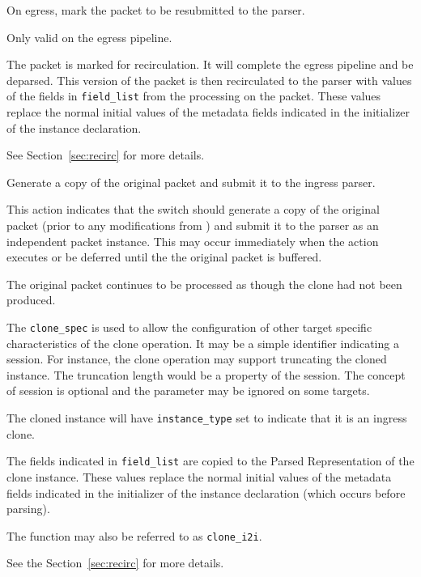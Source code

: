 \documentclass[12pt]{article}
\begin{document}

{ %
On egress, mark the packet to be resubmitted to the parser.
}
{ %
}
{ %
Only valid on the egress pipeline.

The packet is marked for  {\color{red}recirculation}. It will complete the egress pipeline 
and be deparsed.  This version of the packet is then {\color{red}recirculated} to the parser 
with values of the fields in \texttt{field_list} from the processing on the packet. 
These values replace the normal initial values of the metadata fields indicated 
in the initializer of the instance declaration.

See Section~\ref{sec:recirc} for more details.

}


{ %
Generate a copy of the original packet and submit it to the ingress parser.
}
{ %
}
{ %
This action indicates that the switch should generate a copy of the original 
packet (prior to any modifications from \matchaction) and submit it to the 
parser as an independent packet instance.  This may occur immediately when 
the action executes or be deferred until the the original packet is buffered. 
 

The original packet continues to be processed as though the clone had not 
been produced.

The \texttt{clone_spec} is used to allow the configuration of other target specific 
characteristics of the clone operation. It may be a simple identifier indicating 
a session. For instance, the clone operation may support truncating the cloned 
instance. The truncation length would be a property of the session. The concept 
of session is optional and the parameter may be ignored on some targets.

The cloned instance will have \texttt{instance_type} set to indicate that it is an 
ingress clone. 

The fields indicated in \texttt{field_list} are copied to the Parsed Representation 
of the clone instance. These values replace the normal initial values of the 
metadata fields indicated in the initializer of the instance declaration (which 
occurs before parsing).

The function may also be referred to as \texttt{clone_i2i}.

See the Section~\ref{sec:recirc} for more details.
}
\end{document}
